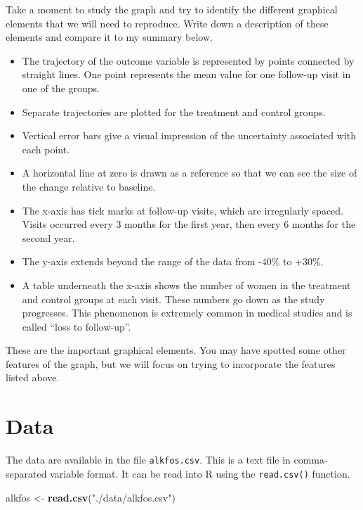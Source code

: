 \documentclass[
]{book}
\newenvironment{Shaded}{\begin{snugshade}}{\end{snugshade}}
\newcommand{\FunctionTok}[1]{\textcolor[rgb]{0.13,0.29,0.53}{\textbf{#1}}}
\newcommand{\NormalTok}[1]{#1}
\newcommand{\OtherTok}[1]{\textcolor[rgb]{0.56,0.35,0.01}{#1}}
\newcommand{\StringTok}[1]{\textcolor[rgb]{0.31,0.60,0.02}{#1}}
\providecommand{\tightlist}{%
  \setlength{\itemsep}{0pt}\setlength{\parskip}{0pt}}
\theoremstyle{definition}
\theoremstyle{definition}
\theoremstyle{definition}
\theoremstyle{definition}
\theoremstyle{remark}
\begin{document}
Take a moment to study the graph and try to identify the different graphical elements that we will need to reproduce. Write down a description of these elements and compare it to my summary below.

\begin{itemize}
\tightlist
\item
  The trajectory of the outcome variable is represented by points connected by straight lines. One point represents the mean value for one follow-up visit in one of the groups.
\item
  Separate trajectories are plotted for the treatment and control groups.
\item
  Vertical error bars give a visual impression of the uncertainty associated with each point.
\item
  A horizontal line at zero is drawn as a reference so that we can see the size of the change relative to baseline.
\item
  The x-axis has tick marks at follow-up visits, which are irregularly spaced. Visits occurred every 3 months for the first year, then every 6 months for the second year.
\item
  The y-axis extends beyond the range of the data from -40\% to +30\%.
\item
  A table underneath the x-axis shows the number of women in the treatment and control groups at each visit. These numbers go down as the study progresses. This phenomenon is extremely common in medical studies and is called ``loss to follow-up''.
\end{itemize}

These are the important graphical elements. You may have spotted some other features of the graph, but we will focus on trying to incorporate the features listed above.

\section{Data}\label{data}

The data are available in the file \texttt{alkfos.csv}. This is a text file in comma-separated variable format. It can be read into R using the \texttt{read.csv()} function.

\begin{Shaded}
\begin{Highlighting}[]
\NormalTok{alkfos }\OtherTok{\textless{}{-}} \FunctionTok{read.csv}\NormalTok{(}\StringTok{"./data/alkfos.csv"}\NormalTok{)}
\end{Highlighting}
\end{Shaded}
\end{document}
